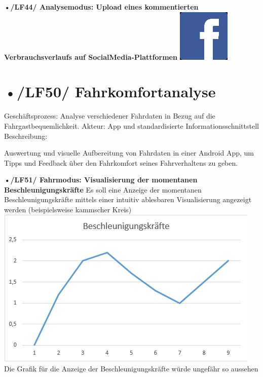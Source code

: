 \textbf{•/LF44/ Analysemodus: Upload eines kommentierten Verbrauchsverlaufs auf SocialMedia-Plattformen }
\includegraphics[scale=0.5]{images/LF44_Facebok.jpg}

\section{•/LF50/ Fahrkomfortanalyse}
Geschäftsprozess:	Analyse verschiedener Fahrdaten in Bezug auf die Fahrgastbequemlichkeit.
Akteur:			App und standardisierte Informationsschnittstell
Beschreibung:	

Auswertung und visuelle Aufbereitung von Fahrdaten in einer Android App, um Tipps und Feedback über den Fahrkomfort seines Fahrverhaltens zu geben.

\textbf{•/LF51/ Fahrmodus: Visualisierung der momentanen Beschleunigungskräfte}
Es soll eine Anzeige der momentanen Beschleunigungskräfte mittels einer intuitiv ablesbaren Visualisierung angezeigt werden (beispielsweise kammscher Kreis)
\includegraphics[scale=0.5]{images/LF51_Beschleunigung.jpg}
Die Grafik für die Anzeige der Beschleunigungskräfte würde ungefähr so aussehen

